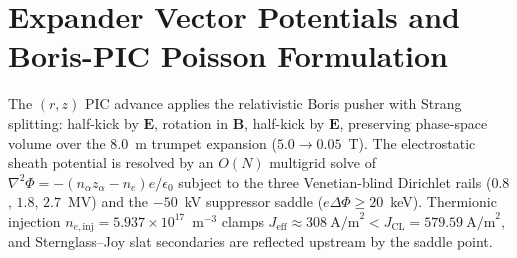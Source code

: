 \section{Expander Vector Potentials and Boris-PIC Poisson Formulation}
The $(r,z)$ PIC advance applies the relativistic Boris pusher with
Strang splitting: half-kick by $\mathbf{E}$, rotation in $\mathbf{B}$,
half-kick by $\mathbf{E}$, preserving phase-space volume over the
$8.0$~m trumpet expansion ($5.0 \to 0.05$~T).  The electrostatic sheath
potential is resolved by an $O(N)$ multigrid solve of
$\nabla^2\Phi = -(n_\alpha z_\alpha - n_e)e/\epsilon_0$ subject to the
three Venetian-blind Dirichlet rails ($0.8$, $1.8$, $2.7$~MV) and the
$-50$~kV suppressor saddle ($e\Delta\Phi \ge 20$~keV).  Thermionic
injection $n_{e,\text{inj}} = 5.937\times10^{17}$~m$^{-3}$ clamps
$J_{\text{eff}} \approx 308~\text{A/m}^2 < J_{\text{CL}} =
579.59~\text{A/m}^2$, and Sternglass--Joy slat secondaries are
reflected upstream by the saddle point.
